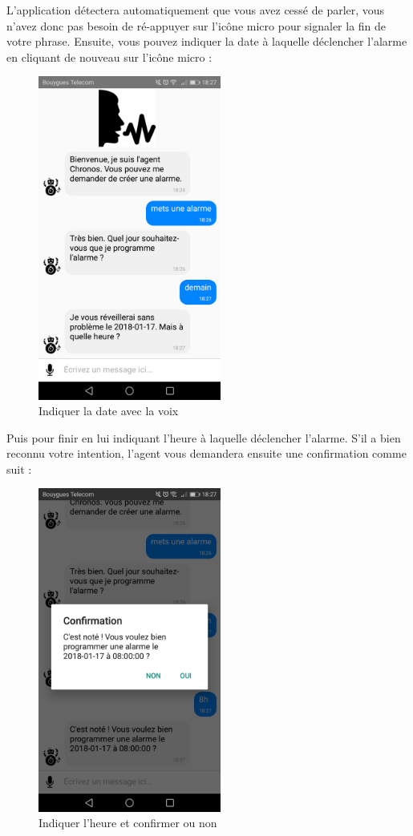 L'application détectera automatiquement que vous avez cessé de parler, vous n'avez donc pas besoin de ré-appuyer sur l'icône micro pour signaler la fin de votre phrase.
Ensuite, vous pouvez indiquer la date à laquelle déclencher l'alarme en cliquant de nouveau sur l'icône micro :

\begin{figure}[H]
  \centering
  \includegraphics[width=6cm]{images/D.png}
  \caption{Indiquer la date avec la voix}
\end{figure}

Puis pour finir en lui indiquant l'heure à laquelle déclencher l'alarme. S'il a bien reconnu votre intention, l'agent vous demandera ensuite une confirmation comme suit :

\begin{figure}[H]
  \centering
  \includegraphics[width=6cm]{images/E.png}
  \caption{Indiquer l'heure et confirmer ou non}
\end{figure}

